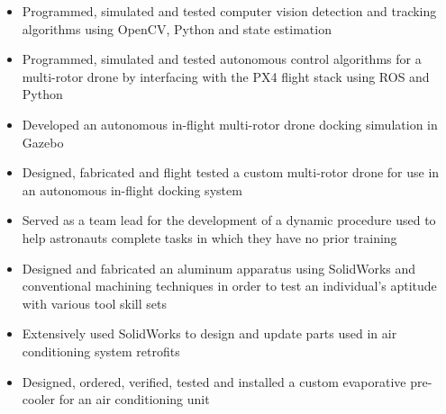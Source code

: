 \documentclass[10pt,letter,ragged2e]{altacv}
\begin{document}

\begin{fullwidth}
  \makecvheader
\end{fullwidth}



\begin{itemize}
  \item Programmed, simulated and tested computer vision detection and tracking algorithms using OpenCV, Python and state estimation
  \item Programmed, simulated and tested autonomous control algorithms for a multi-rotor drone by interfacing with the PX4 flight stack using ROS and Python 
  \item Developed an autonomous in-flight multi-rotor drone docking simulation in Gazebo
  \item Designed, fabricated and flight tested a custom multi-rotor drone for use in an autonomous in-flight docking system 
\end{itemize}

\begin{itemize}
  \item Served as a team lead for the development of a dynamic procedure used to help astronauts complete tasks in which they have no prior training 
  \item Designed and fabricated an aluminum apparatus using SolidWorks and conventional machining techniques in order to test an individual’s aptitude with various tool skill sets
\end{itemize}

\divider

\begin{itemize}
  \item Extensively used SolidWorks to design and update parts used in air conditioning system retrofits
  \item Designed, ordered, verified, tested and installed a custom evaporative pre-cooler for an air conditioning unit
\end{itemize}
\end{document}
